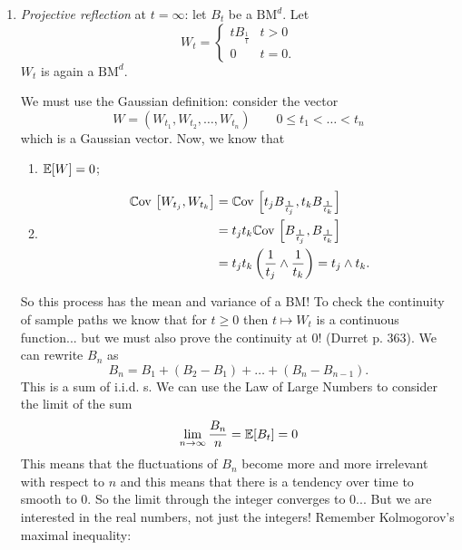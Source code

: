 \documentclass[12pt]{report}
\begin{document}
\begin{enumerate}[\circnum]
	\item \emph{Projective reflection} at $t=\infty$: let $B_{t}$ be a $\mathrm{BM}^{d}$. Let 
	\begin{equation*}
		W_{t}=\begin{cases}
			tB_{\frac{1}{t}}&t>0\\
			0&t=0.
		\end{cases}
	\end{equation*}
	$W_{t}$ is again a $\mathrm{BM}^{d}$.
	\begin{fancyproof}
		We must use the Gaussian definition: consider the vector
		\begin{equation*}
			W=\left(W_{t_{1}},W_{t_{2}},\ldots,W_{t_{n}}\right) \qquad0\leq t_{1}<\ldots<t_{n}
		\end{equation*}
		which is a Gaussian vector. Now, we know that 
		\begin{enumerate}
			\item $\mathbb{E}[W]=0$;
			\item \begin{align*}
				\mathbb{C}\mathrm{ov}\,\left[W_{t_{j}},W_{t_{k}}\right]&=\mathbb{C}\mathrm{ov}\,\left[t_{j}B_{\frac{1}{t_{j}}},t_{k}B_{\frac{1}{t_{k}}}\right]\\
				&=t_{j}t_{k}\mathbb{C}\mathrm{ov}\,\left[B_{\frac{1}{t_{j}}},B_{\frac{1}{t_{k}}}\right]\\
				&=t_{j}t_{k}\left(\frac{1}{t_{j}}\wedge\frac{1}{t_{k}}\right)=t_{j}\wedge t_{k}.
			\end{align*}
				\end{enumerate}
				So this process has the mean and variance of a BM!
			To check the continuity of sample paths we know that for $t\geq0$ then $t\mapsto W_{t}$ is a continuous function... but we must also prove the continuity at 0! (Durret p. 363).
			We can rewrite $B_{n}$ as
			\begin{equation*}
				B_{n}=B_{1}+(B_{2}-B_{1})+\ldots+(B_{n}-B_{n-1}).
			\end{equation*}
			This is a sum of i.i.d. \rv s. We can use the Law of Large Numbers to consider the limit of the sum
			\begin{equation*}
				\lim_{n\to\infty}\frac{B_{n}}{n}=\mathbb{E}[B_{t}]=0
			\end{equation*}
			This means that the fluctuations of $B_{n}$ become more and more irrelevant with respect to $n$ and this means that there is a tendency over time to smooth to 0. So the limit through the integer converges to 0... But we are interested in the real numbers, not just the integers! Remember Kolmogorov's maximal inequality:
			\begin{revise}

\end{revise}
\end{fancyproof}
\end{enumerate}
\end{document}
